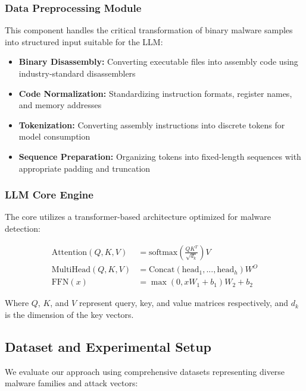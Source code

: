 \documentclass[12pt,a4paper]{article}
\begin{document}
\subsubsection{Data Preprocessing Module}
This component handles the critical transformation of binary malware samples
into structured input suitable for the LLM:
\begin{itemize}
    \item \textbf{Binary Disassembly:} Converting executable files into assembly code using industry-standard disassemblers
    \item \textbf{Code Normalization:} Standardizing instruction formats, register names, and memory addresses
    \item \textbf{Tokenization:} Converting assembly instructions into discrete tokens for model consumption
    \item \textbf{Sequence Preparation:} Organizing tokens into fixed-length sequences with appropriate padding and truncation
\end{itemize}

\subsubsection{LLM Core Engine}
The core utilizes a transformer-based architecture optimized for malware
detection:

\begin{align}
    \text{Attention}(Q, K, V) & = \text{softmax}\left(\frac{QK^T}{\sqrt{d_k}}\right)V \\
    \text{MultiHead}(Q, K, V) & = \text{Concat}(\text{head}_1, ..., \text{head}_h)W^O \\
    \text{FFN}(x)             & = \max(0, xW_1 + b_1)W_2 + b_2
\end{align}

Where $Q$, $K$, and $V$ represent query, key, and value matrices respectively,
and $d_k$ is the dimension of the key vectors.

\subsection{Dataset and Experimental Setup}

We evaluate our approach using comprehensive datasets representing diverse
malware families and attack vectors:
\end{document}
